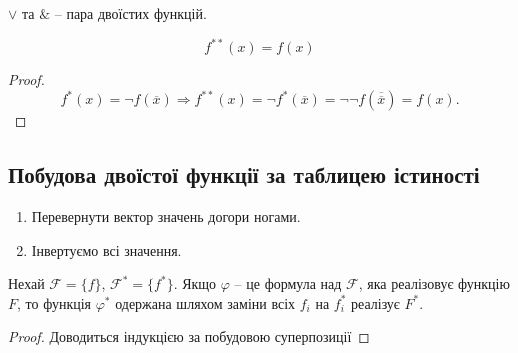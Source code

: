$\vee$ та $\&$ -- пара двоїстих функцій.

\begin{lemma}
    \begin{equation*}
        f^{**}(x) = f(x)
    \end{equation*}
\end{lemma}
\begin{proof}
    \begin{equation*}
        f^*(x) = \neg f(\overline{x}) \Rightarrow f^{**}(x) = \neg f^{*}(\overline{x}) = \neg \neg f(\overline{\overline{x}}) = f(x).
    \end{equation*}
\end{proof}

\subsection{Побудова двоїстої функції за таблицею істиності}

\begin{enumerate}
    \item Перевернути вектор значень догори ногами.
    \item Інвертуємо всі значення.
\end{enumerate}

\begin{theorem}
    Нехай $\mathcal{F} = \{f\}$, $\mathcal{F}^* = \{f^*\}$.
    Якщо $\varphi$ -- це формула над $\mathcal{F}$, яка реалізовує функцію $F$, то
    функція $\varphi^*$ одержана шляхом заміни всіх $f_i$ на $f_i^*$ реалізує $F^*$.
\end{theorem}
\begin{proof}
    Доводиться індукцією за побудовою суперпозиції
\end{proof}

